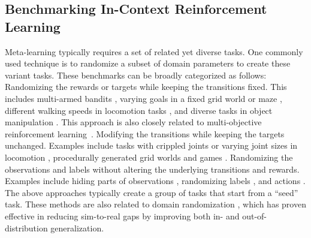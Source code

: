 \subsection{Benchmarking In-Context Reinforcement Learning}
Meta-learning typically requires a set of related yet diverse tasks. One commonly used technique is to randomize a subset of domain parameters to create these variant tasks. These benchmarks can be broadly categorized as follows:
 Randomizing the rewards or targets while keeping the transitions fixed. This includes multi-armed bandits \cite{mishra2018simple, laskin2022context}, varying goals in a fixed grid world or maze \cite{lee2024supervised}, different walking speeds in locomotion tasks \cite{finn2017model, mishra2018simple}, and diverse tasks in object manipulation \cite{yu2020meta}. This approach is also closely related to multi-objective reinforcement learning~\cite{alegre2022mo}.
 Modifying the transitions while keeping the targets unchanged. Examples include tasks with crippled joints or varying joint sizes in locomotion \cite{najarro2020meta,pedersen2021evolving}, procedurally generated grid worlds \cite{wang2022evolving,nikulin2023xland} and games \cite{cobbe2020leveraging}.
 Randomizing the observations and labels without altering the underlying transitions and rewards. Examples include hiding parts of observations \cite{morad2023popgym}, randomizing labels \cite{kirsch2022general}, and actions \cite{siniicontext}.
The above approaches typically create a group of tasks that start from a ``seed'' task. These methods are also related to domain randomization \cite{peng2018sim,arndt2020meta}, which has proven effective in reducing sim-to-real gaps by improving both in- and out-of-distribution generalization\cite{peng2022out}.